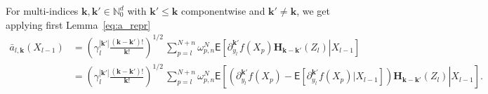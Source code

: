 \documentclass[article]{elsarticle}
\begin{document}
For multi-indices $\mathbf k,\mathbf k'\in\mathbb N_0^d$
with $\mathbf k'\le\mathbf k$ componentwise
and $\mathbf k'\ne\mathbf k$,
we get applying first Lemma~\ref{eq:a_repr}
\begin{equation*}
\begin{split}
\bar a_{l,\mathbf{k}}(X_{l-1})
&=\left(\gamma_{l}^{|\mathbf{k}'|}\frac{(\mathbf{k}-\mathbf{k}')!}{\mathbf{k}!}\right)^{1/2}
\,\sum_{p=l}^{N+n}\omega_{p,n}^N
\mathsf E\left[\left.
\partial_{y_l}^{\mathbf{k}'}f(X_p)\mathbf{H}_{\mathbf{k}-\mathbf{k}'}(Z_l)\right|X_{l-1}\right]\\
&=\left(\gamma_{l}^{|\mathbf{k}'|}\frac{(\mathbf{k}-\mathbf{k}')!}{\mathbf{k}!}\right)^{1/2}
\,\sum_{p=l}^{N+n}\omega_{p,n}^N
\mathsf E\left[\left.
\left(
\partial_{y_l}^{\mathbf{k}'}f(X_p)-\mathsf E\left[\partial_{y_l}^{\mathbf{k}'}f(X_p)|X_{l-1}\right]
\right)
\mathbf{H}_{\mathbf{k}-\mathbf{k}'}(Z_l)\right|X_{l-1}\right].
\end{split}
\end{equation*}
\end{document}

